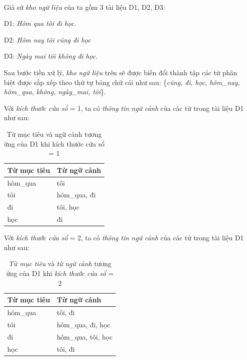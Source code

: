 \begin{exmp}
\label{ex:skip-gram-corpus}
\hrulefill\\
Giả sử \textit{kho ngữ liệu} của ta gồm 3 tài liệu D1, D2, D3:

	D1: \textit{Hôm qua tôi đi học.}
	
    D2: \textit{Hôm nay tôi cũng đi học}
    
    D3: \textit{Ngày mai tôi không đi học.}
    
Sau bước tiền xử lý, \textit{kho ngữ liệu} trên sẽ được biến đổi thành tập các từ phân biệt được sắp xếp theo thứ tự bảng chữ cái như sau: \{\textit{cũng, đi, học, hôm\_nay, hôm\_qua, không, ngày\_mai, tôi}\}.

Với \textit{kích thước cửa sổ} = 1, ta có \textit{thông tin ngữ cảnh} của các từ trong tài liệu D1 như sau:

\begin{table}[!h]
\centering
\begin{tabular}{|l|l|}
\hline
\textbf{Từ mục tiêu} & \textbf{Từ ngữ cảnh} \\ \hline
hôm\_qua             & tôi                  \\ \hline
tôi                  & hôm\_qua, đi         \\ \hline
đi                   & tôi, học             \\ \hline
học                  & đi                   \\ \hline
\end{tabular}
\caption{Từ mục tiêu và ngữ cảnh tương ứng của D1 khi kích thước cửa sổ = 1}
\label{tab:window-size-1}
\end{table}

Với \textit{kích thước cửa sổ} = 2, ta có \textit{thông tin ngữ cảnh} của các từ trong tài liệu D1 như sau:

\begin{table}[ht]
\centering
\begin{tabular}{|l|l|}
\hline
\textbf{Từ mục tiêu} & \textbf{Từ ngữ cảnh} \\ \hline
hôm\_qua             & tôi, đi              \\ \hline
tôi                  & hôm\_qua, đi, học    \\ \hline
đi                   & hôm\_qua, tôi, học   \\ \hline
học                  & tôi, đi              \\ \hline
\end{tabular}
\caption{\textit{Từ mục tiêu} và \textit{từ ngữ cảnh} tương ứng của D1 khi \textit{kích thước cửa sổ} = 2}
\label{tab:window-size-2}
\end{table}

\end{exmp}

